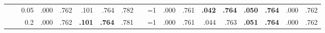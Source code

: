 \documentclass{article}
\begin{document}
\begin{table}[h]
{\begin{tabular}{l@{\hskip 12pt} l@{\hskip 12pt} r@{\hskip 12pt} rr@{\hskip 12pt} rr@{\hskip 12pt} rr@{\hskip 12pt} rr@{\hskip 12pt} rr@{\hskip 12pt} rr@{\hskip 12pt} rr@{\hskip 12pt}}
 &  & 0.05 & .000 & .762 & \cellcolor{red!20}.101 & \cellcolor{red!20}.764 & \cellcolor{red!20}.782 & \cellcolor{red!20}~~{=}1 & .000 & .761 & \textbf{.042} & \textbf{.764} & \textbf{.050} & \textbf{.764} & .000 & .762 \\
 &  & 0.2 & .000 & .762 & \textbf{.101} & \textbf{.764} & \cellcolor{red!20}.781 & \cellcolor{red!20}~~{=}1 & .000 & .761 & .044 & .763 & \textbf{.051} & \textbf{.764} & .000 & .762 \\

\bottomrule
\end{tabular}

}

\end{table}
\end{document}

